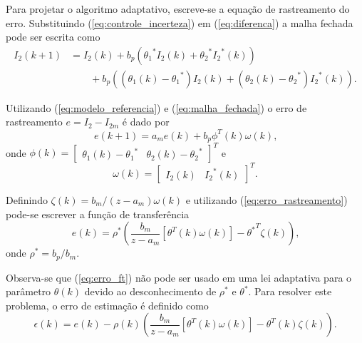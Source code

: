     Para projetar o algoritmo adaptativo, escreve-se a equação de rastreamento do erro. Substituindo (\ref{eq:controle_incerteza}) em (\ref{eq:diferenca}) a malha fechada pode ser escrita como
    \begin{equation}
        \begin{split}
        I_2 (k + 1) &= I_2 (k) + b_p \left( {\theta_1}^* I_2 (k) + {\theta_2}^* {I_2}^*
            (k) \right)\\
            &\qquad {}+ b_p \left( (\theta_1 (k) - {\theta_1}^*) I_2 (k) + ( \theta_2 (k)
            - {\theta_2}^*) {I_2}^* (k) \right) \text{.}
        \end{split}
        \label{eq:malha_fechada}
    \end{equation}

    Utilizando (\ref{eq:modelo_referencia}) e (\ref{eq:malha_fechada}) o erro de rastreamento $e = I_2 - I_{2m}$ é dado por
    \begin{equation}
        e (k+1) = a_m e(k) + b_p \phi^T (k) \omega (k) \text{,}
        \label{eq:erro_rastreamento}
    \end{equation}
    onde $\phi (k) = {\left[ \begin{matrix} \theta_1 (k) - {\theta_1}^* & \theta_2 (k) - {\theta_2}^*
    \end{matrix} \right]}^T$ e
    \begin{equation}
        \omega (k) = {\left[ \begin{matrix} I_2 (k) & {I_2}^* (k) \end{matrix} \right]}^T \text{.}
        \label{eq:omega_k}
    \end{equation}

    Definindo $\zeta (k) = b_m / (z - a_m) \omega (k)$ e utilizando (\ref{eq:erro_rastreamento}) pode-se escrever a função de transferência
    \begin{equation}
        e(k) = \rho^* \left( \frac{b_m}{z - a_m} \left[ \theta^T (k) \omega (k) \right]
            - {\theta^*}^T \zeta (k) \right) \text{,}
        \label{eq:erro_ft}
    \end{equation}
    onde $\rho^* = b_p / b_m$.

    Observa-se que (\ref{eq:erro_ft}) não pode ser usado em uma lei adaptativa para o parâmetro $\theta (k)$ devido ao desconhecimento de $\rho^*$ e $\theta^*$. Para resolver este problema, o erro de estimação é definido como
    \begin{equation}
        \epsilon (k) = e (k) - \rho(k) \left( \frac{b_m}{z - a_m} \left[ \theta^T (k) \omega(k)
            \right] - \theta^T (k) \zeta(k) \right) \text{.}
        \label{eq:erro_estimacao}
    \end{equation}

